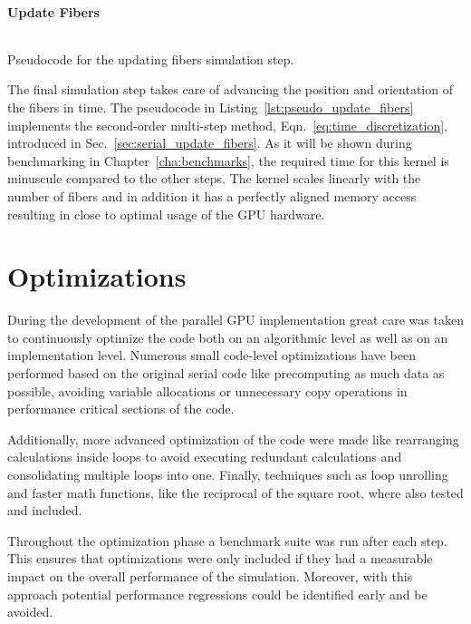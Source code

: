 \paragraph{Update Fibers}

\begin{listing}[!htbp]
  \centering
  \inputminted[mathescape,
    linenos,
    numbersep=5pt,
    fontsize=\footnotesize,
    frame=lines,
    framesep=2mm]{c}{lst/update_fibers.lst}
  \caption{Pseudocode for the updating fibers simulation step.}
  \label{lst:pseudo_update_fibers}
\end{listing}

The final simulation step takes care of advancing the position and orientation of the fibers in time. The pseudocode in Listing~\ref{lst:pseudo_update_fibers} implements the second-order multi-step method, Eqn.~\eqref{eq:time_discretization}, introduced in Sec.~\ref{sec:serial_update_fibers}. As it will be shown during benchmarking in Chapter~\ref{cha:benchmarks}, the required time for this kernel is minuscule compared to the other steps. The kernel scales linearly with the number of fibers and in addition it has a perfectly aligned memory access resulting in close to optimal usage of the GPU hardware.

\newpage
\section{Optimizations}
\label{sec:parallel_optimizations}

During the development of the parallel GPU implementation great care was taken to continuously optimize the code both on an algorithmic level as well as on an implementation level. Numerous small code-level optimizations have been performed based on the original serial code like precomputing as much data as possible, avoiding variable allocations or unnecessary copy operations in performance critical sections of the code.

Additionally, more advanced optimization of the code were made like rearranging calculations inside loops to avoid executing redundant calculations and consolidating multiple loops into one. Finally, techniques such as loop unrolling and faster math functions, like the reciprocal of the square root, where also tested and included.

Throughout the optimization phase a benchmark suite was run after each step. This ensures that optimizations were only included if they had a measurable impact on the overall performance of the simulation. Moreover, with this approach potential performance regressions could be identified early and be avoided.

